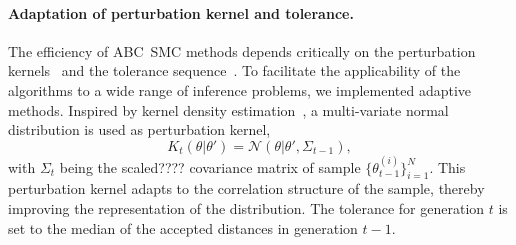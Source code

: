 \documentclass[10pt,letterpaper]{article}
\newcommand{\jh}[1]{{\color{red}#1}}
\begin{document}
\paragraph{Adaptation of perturbation kernel and tolerance.}
The efficiency of ABC~SMC methods depends critically on the perturbation kernels~\cite{FilippiBar2013} and the tolerance sequence~\cite{Silk2013}. To facilitate the applicability of the algorithms to a wide range of inference problems, we implemented adaptive methods. Inspired by kernel density estimation~\cite{Scott1992}, a multi-variate normal distribution is used as perturbation kernel,
\begin{equation*}
K_t(\theta|\theta') = \mathcal{N}(\theta|\theta',\Sigma_{t-1}),
\end{equation*}
with $\Sigma_t$ being the \jh{scaled????} covariance matrix of sample $\{\theta^{(i)}_{t-1}\}_{i=1}^N$. This perturbation kernel adapts to the correlation structure of the sample, thereby improving the representation of the distribution. The tolerance for generation $t$ is set to the median of the accepted distances in generation $t-1$.
\end{document}
